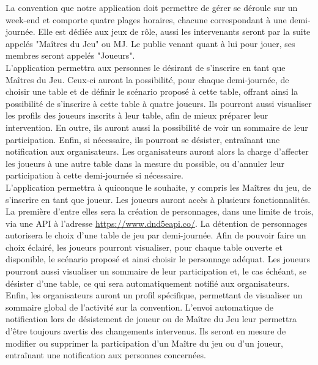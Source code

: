 \documentclass[11pt]{article}
\begin{document}
La convention que notre application doit permettre de gérer se déroule sur un week-end et comporte quatre plages horaires, chacune correspondant à une demi-journée. Elle est dédiée aux jeux de rôle, aussi les intervenants seront par la suite appelés "Maîtres du Jeu" ou MJ. Le public venant quant à lui pour jouer, ses membres seront appelés "Joueurs".\\ 


L'application permettra aux personnes le désirant de s'inscrire en tant que Maîtres du Jeu. Ceux-ci auront la possibilité, pour chaque demi-journée, de choisir une table  et de définir le scénario proposé à cette table, offrant ainsi la possibilité de s'inscrire à cette table à quatre joueurs. Ils pourront aussi visualiser les profils des joueurs inscrits à leur table, afin de mieux préparer leur intervention. En outre, ils auront aussi la possibilité de voir un sommaire de leur participation. Enfin, si nécessaire, ils pourront se désister, entraînant une notification aux organisateurs. Les organisateurs auront alors la charge d'affecter les joueurs à une autre table dans la mesure du possible, ou d'annuler leur participation à cette demi-journée si nécessaire.\\

L'application permettra à quiconque le souhaite, y compris les Maîtres du jeu, de s'inscrire en tant que joueur. Les joueurs auront accès à plusieurs fonctionnalités. La première d'entre elles sera la création de personnages, dans une limite de trois, via une API à l'adresse \href{https://www.dnd5eapi.co/}{https://www.dnd5eapi.co/}. La détention de personnages autorisera le choix d'une table de jeu par demi-journée. Afin de pouvoir faire un choix éclairé, les joueurs pourront visualiser, pour chaque table ouverte et disponible, le scénario proposé et ainsi choisir le personnage adéquat. Les joueurs pourront aussi visualiser un sommaire de leur participation et, le cas échéant, se désister d'une table, ce qui sera automatiquement notifié aux organisateurs.\\

Enfin, les organisateurs auront un profil spécifique, permettant de visualiser un sommaire global de l'activité sur la convention. L'envoi automatique de notification lors de désistement de joueur ou de Maître du Jeu leur permettra d'être toujours avertis des changements intervenus. Ils seront en mesure de modifier ou supprimer la participation d'un Maître du jeu ou d'un joueur, entraînant une notification aux personnes concernées.\\
\end{document}
